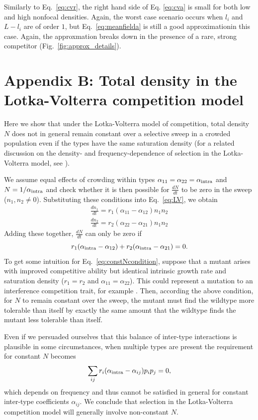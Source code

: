 \documentclass[12pt]{article}
\begin{document}
Similarly to Eq.~\eqref{eq:cvr}, the right hand side of Eq. \eqref{eq:cva} is small for both low and high nonfocal densities. Again, the worst case scenario occurs when $l_i$ and $L-l_i$ are of order $1$, but Eq.~\eqref{eq:meanfielda} is still a good approximationin this case. Again, the approxmation breaks down in the presence of a rare, strong competitor (Fig.~\ref{fig:approx_details}).

\section*{Appendix B: Total density in the Lotka-Volterra competition model}

Here we show that under the Lotka-Volterra model of competition, total density $N$ does not in general remain constant over a selective sweep in a crowded population even if the types have the same saturation density (for a related discussion on the density- and frequency-dependence of selection in the Lotka-Volterra model, see \citep{smouse_1976,mallet_2012}).

We assume equal effects of crowding within types $\alpha_{11}=\alpha_{22}=\alpha_{\rm intra}$ and $N=1/\alpha_{\rm intra}$ and check whether it is then possible for $\frac{dN}{dt}$ to be zero in the sweep ($n_1,n_2 \neq 0$). Substituting these conditions into Eq.~\eqref{eq:LV}, we obtain 
\begin{align}
\frac{d n_1}{dt} = r_1(\alpha_{11}-\alpha_{12})n_1n_2 \nonumber\\
\frac{d n_2}{dt} = r_2(\alpha_{22}-\alpha_{21})n_1n_2
\end{align}
Adding these together, $\frac{dN}{dt}$ can only be zero if 
\begin{equation}
r_1(\alpha_{\rm intra}-\alpha_{12})+r_2(\alpha_{\rm intra}-\alpha_{21})=0. \label{eq:constNcondition}
\end{equation}
To get some intuition for Eq.~\eqref{eq:constNcondition}, suppose that a mutant arises with improved competitive ability but identical intrinsic growth rate and saturation density ($r_1=r_2$ and $\alpha_{11}=\alpha_{22}$). This could represent a mutation to an interference competition trait, for example \citep{gill_1974}. Then, according the above condition, for $N$ to remain constant over the sweep, the mutant must find the wildtype more tolerable than itself by exactly the same amount that the wildtype finds the mutant less tolerable than itself. 

Even if we persuaded ourselves that this balance of inter-type interactions is plausible in some circumstances, when multiple types are present the requirement for constant $N$ becomes
\begin{equation}
\sum_{ij}r_i(\alpha_{\rm intra}-\alpha_{ij})p_ip_j=0,
\end{equation}
which depends on frequency and thus cannot be satisfied in general for constant inter-type coefficients $\alpha_{ij}$. We conclude that selection in the Lotka-Volterra competition model will generally involve non-constant $N$.
\end{document}
